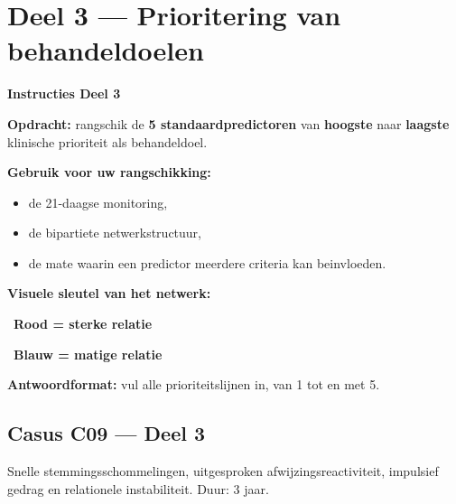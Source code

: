 \documentclass[11pt,a4paper]{article}
\begin{document}
\vspace{0.6em}
\newpage


\section{Deel 3 --- Prioritering van behandeldoelen}

\begin{tcolorbox}[colback=yellow!5,colframe=GoldAmber,arc=2.5mm,boxrule=0.9pt,
  left=10pt,right=10pt,top=9pt,bottom=9pt]
\textbf{\color{GoldAmber}Instructies Deel 3}

\smallskip\small
\textbf{Opdracht:} rangschik de \textbf{5 standaardpredictoren} van \textbf{hoogste} naar \textbf{laagste}
klinische prioriteit als behandeldoel.

\textbf{Gebruik voor uw rangschikking:}
\begin{itemize}[topsep=2pt,itemsep=1pt]
\item de 21-daagse monitoring,
\item de bipartiete netwerkstructuur,
\item de mate waarin een predictor meerdere criteria kan beinvloeden.
\end{itemize}

\textbf{Visuele sleutel van het netwerk:}
\begin{center}
~\textbf{Rood = sterke relatie}\qquad
{}~\textbf{Blauw = matige relatie}
\end{center}

\textbf{Antwoordformat:} vul alle prioriteitslijnen in, van 1 tot en met 5.
\end{tcolorbox}

\vspace{0.5em}
\subsection*{Casus C09 --- Deel 3}

\begin{complaintbox}[title={Casus C09 --- 27-jarige salesvertegenwoordiger}]
\small Snelle stemmingsschommelingen, uitgesproken afwijzingsreactiviteit, impulsief gedrag en relationele instabiliteit. Duur: 3 jaar.
\end{complaintbox}
\end{document}
